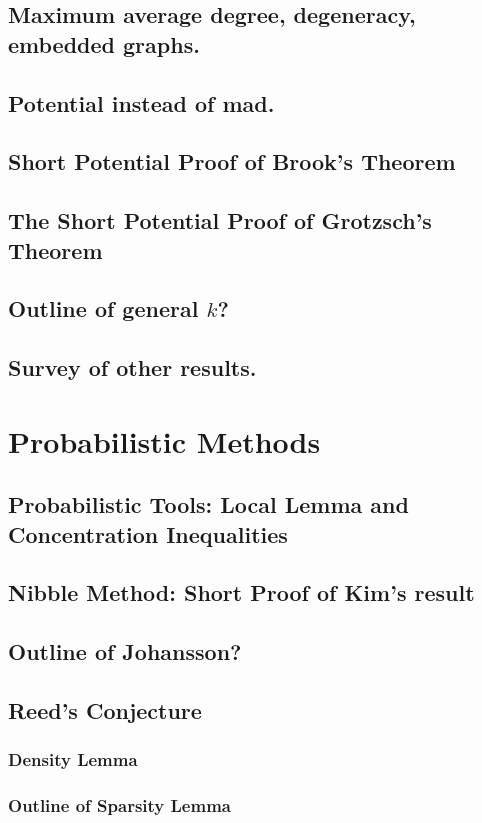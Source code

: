 \documentclass[12pt,twoside,openright,a4paper]{book}
\begin{document}

\section{Maximum average degree, degeneracy, embedded graphs.}
\section{Potential instead of mad.}
\section{Short Potential Proof of Brook's Theorem}
\section{The Short Potential Proof of Grotzsch's Theorem}
\section{Outline of general $k$?}
\section{Survey of other results.}

\chapter{Probabilistic Methods}
\section{Probabilistic Tools: Local Lemma and Concentration Inequalities}
\section{Nibble Method: Short Proof of Kim's result}
\section{Outline of Johansson?}
\section{Reed's Conjecture}
\subsection{Density Lemma}
\subsection{Outline of Sparsity Lemma}
\end{document}
